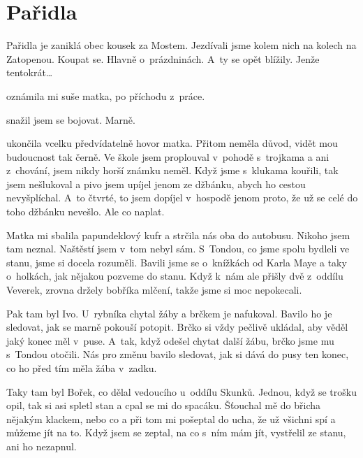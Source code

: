 
\chapter{Pařidla}

Pařidla je zaniklá obec kousek za Mostem. Jezdívali jsme kolem nich na kolech
na Zatopenou. Koupat se. Hlavně o~prázdninách. A~ty se opět blížily. Jenže
tentokrát\dots

 oznámila mi
suše matka, po příchodu z~práce.

 snažil jsem se bojovat. Marně.

 ukončila vcelku předvídatelně hovor
matka. Přitom neměla důvod, vidět mou budoucnost tak černě. Ve škole jsem
proplouval v~pohodě s~trojkama a ani z~chování, jsem nikdy horší známku neměl.
Když jsme s~klu\-kama kouřili, tak jsem nešlukoval a pivo jsem upíjel jenom ze
džbánku, abych ho cestou nevyšplíchal. A~to čtvrté, to jsem dopíjel v~hospodě
jenom proto, že už se celé do toho džbánku nevešlo. Ale co naplat.

Matka mi sbalila papundeklový kufr a strčila nás oba do autobusu. Nikoho jsem
tam neznal. Naštěstí jsem v~tom nebyl sám. S~Tondou, co jsme spolu bydleli ve
stanu, jsme si docela rozuměli. Bavili jsme se o~knížkách od Karla Maye a taky
o~holkách, jak nějakou pozveme do stanu. Když k~nám ale přišly dvě z~oddílu
Veverek, zrovna držely bobříka mlčení, takže jsme si moc nepokecali.

Pak tam byl Ivo. U~rybníka chytal žáby a brčkem je nafukoval. Bavilo ho je
sledovat, jak se marně pokouší potopit. Brčko si vždy pečlivě ukládal, aby
věděl jaký konec měl v~puse. A~tak, když odešel chytat další žábu, brčko jsme
mu s~Tondou otočili. Nás pro změnu bavilo sledovat, jak si dává do pusy ten
konec, co ho před tím měla žába v~zadku.

Taky tam byl Bořek, co dělal vedoucího u~oddílu Skunků. Jednou, když se trošku
opil, tak si asi spletl stan a cpal se mi do spacáku. Šťouchal mě do břicha
nějakým klackem, nebo co a při tom mi pošeptal do ucha, že už všichni spí a
můžeme jít na to. Když jsem se zeptal, na co s~ním mám jít, vystřelil ze stanu,
ani ho nezapnul.

